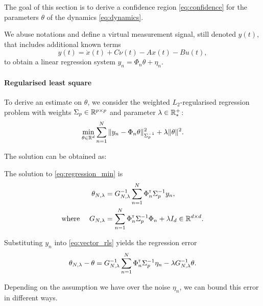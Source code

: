The goal of this section is to derive a confidence region \eqref{eq:confidence} for the parameters $\theta$ of the dynamics \eqref{eq:dynamics}.


We abuse notations and define a virtual measurement signal, still denoted $y(t)$, that includes additional known terms
\begin{equation*}
y(t) = \dot{x}(t) + C\nu(t) - A x(t) - Bu(t),
\end{equation*}
to obtain a linear regression system
$
y_n = \Phi_n\theta + \eta_n.
$

\paragraph{Regularised least square} To derive an estimate on $\theta$, we consider the weighted $L_2$-regularised regression problem with weights $\Sigma_p\in\mathbb{R}^{p\times p}$ and parameter $\lambda\in\mathbb{R}^+_*$:
\begin{equation}
\label{eq:regression_min}
\min_{\theta\in\mathbb{R}^d} \sum_{n=1}^N \|y_n -\Phi_n\theta\|_{\Sigma_p^{-1}}^2 + \lambda\|\theta\|_{}^2.
\end{equation}


The solution can be obtained as:

\begin{proposition}
	\label{prop:regularized_solution}
	\begin{leftbar}[propositionbar]
	The solution to \eqref{eq:regression_min} is
	\begin{align}
	\label{eq:vector_rls}
	\theta_{N,\lambda} &= G_{N, \lambda}^{-1} \sum_{n=1}^N \Phi_n^{\mathsf{\scriptscriptstyle T}} \Sigma_p^{-1} y_n,\\
	\label{eq:g_n_lambda}
	\text{where }\quad G_{N, \lambda} &= \sum_{n=1}^N \Phi_{n}^{\mathsf{\scriptscriptstyle T}}\Sigma_p^{-1}\Phi_{n}  + \lambda I_d \in \mathbb{R}^{d\times d}.
	\end{align}
	\end{leftbar}
\end{proposition}

Substituting $y_n$ into \eqref{eq:vector_rls} yields the regression error
\begin{align}
\theta_{N,\lambda} - \theta = G_{N, \lambda}^{-1}\sum_{n=1}^N \Phi_n^{\mathsf{\scriptscriptstyle T}} \Sigma_p^{-1}\eta_n - \lambda G_{N, \lambda}^{-1}\theta.
\end{align}


Depending on the assumption we have over the noise $\eta_n$, we can bound this error in different ways.


